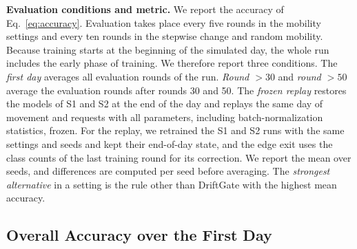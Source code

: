 \textbf{Evaluation conditions and metric.} We report the accuracy of Eq.~\eqref{eq:accuracy}. Evaluation takes place every five rounds in the mobility settings and every ten rounds in the stepwise change and random mobility. Because training starts at the beginning of the simulated day, the whole run includes the early phase of training. We therefore report three conditions. The \emph{first day} averages all evaluation rounds of the run. \emph{Round $>30$} and \emph{round $>50$} average the evaluation rounds after rounds 30 and 50. The \emph{frozen replay} restores the models of S1 and S2 at the end of the day and replays the same day of movement and requests with all parameters, including batch-normalization statistics, frozen. For the replay, we retrained the S1 and S2 runs with the same settings and seeds and kept their end-of-day state, and the edge exit uses the class counts of the last training round for its correction. We report the mean over seeds, and differences are computed per seed before averaging. The \emph{strongest alternative} in a setting is the rule other than DriftGate with the highest mean accuracy.

\subsection{Overall Accuracy over the First Day}
\label{sec:overall}

